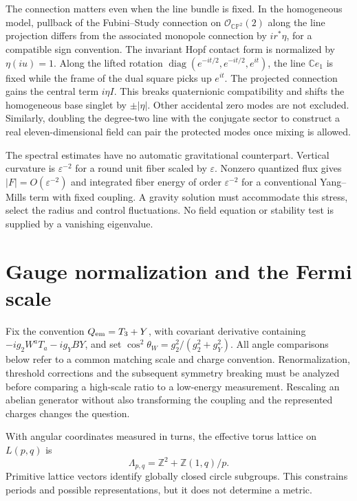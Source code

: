 \documentclass[11pt,oneside]{article}
\newcommand{\C}{\mathbb C}
\newcommand{\Z}{\mathbb Z}
\newcommand{\CP}{\mathbb{CP}}
\newcommand{\OO}{\mathcal O}
\begin{document}
The connection matters even when the line bundle is fixed. In the homogeneous model, pullback of the Fubini--Study connection on \(\OO_{\CP^2}(2)\) along the line projection differs from the associated monopole connection by \(i r^*\eta\), for a compatible sign convention. The invariant Hopf contact form is normalized by \(\eta(iu)=1\). Along the lifted rotation \(\operatorname{diag}(e^{-it/2},e^{-it/2},e^{it})\), the line \(\C e_1\) is fixed while the frame of the dual square picks up \(e^{it}\). The projected connection gains the central term \(i\eta I\). This breaks quaternionic compatibility and shifts the homogeneous base singlet by \(\pm|\eta|\). Other accidental zero modes are not excluded. Similarly, doubling the degree-two line with the conjugate sector to construct a real eleven-dimensional field can pair the protected modes once mixing is allowed.

The spectral estimates have no automatic gravitational counterpart. Vertical curvature is \(\varepsilon^{-2}\) for a round unit fiber scaled by \(\varepsilon\). Nonzero quantized flux gives \(|F|=O(\varepsilon^{-2})\) and integrated fiber energy of order \(\varepsilon^{-2}\) for a conventional Yang--Mills term with fixed coupling. A gravity solution must accommodate this stress, select the radius and control fluctuations. No field equation or stability test is supplied by a vanishing eigenvalue.

\section{Gauge normalization and the Fermi scale}
Fix the convention \(Q_{\rm em}=T_3+Y\), with covariant derivative containing \(-ig_2W^aT_a-ig_Y B Y\), and set \(\cos^2\theta_W=g_2^2/(g_2^2+g_Y^2)\). All angle comparisons below refer to a common matching scale and charge convention. Renormalization, threshold corrections and the subsequent symmetry breaking must be analyzed before comparing a high-scale ratio to a low-energy measurement. Rescaling an abelian generator without also transforming the coupling and the represented charges changes the question.

With angular coordinates measured in turns, the effective torus lattice on \(L(p,q)\) is
\[
 \Lambda_{p,q}=\Z^2+\Z(1,q)/p.
\]
Primitive lattice vectors identify globally closed circle subgroups. This constrains periods and possible representations, but it does not determine a metric.
\end{document}
